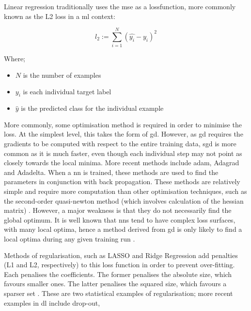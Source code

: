 Linear regression traditionally uses the  \gls{mse} as a \gls{lossfunction}, more commonly known as the L2 loss in a \gls{ml} context:

\begin{equation}
l_2 := \sum_{i = 1}^N (\hat{y_i} - y_i)^2
\end{equation}

Where;

\begin{itemize}
    \item $N$ is the number of examples  
    \item $y_i$ is each individual target label  
    \item $\hat{y}$ is the predicted class for the individual example 
\end{itemize}

More commonly, some optimisation method is required in order to minimise the \gls{loss}. At the simplest level, this takes the form of \gls{gd}. However, as \gls{gd} requires the gradients to be computed with respect to the entire training data, \gls{sgd} is more common as it is much faster, even though each individual step may not point as closely towards the local minima. More recent methods include  \gls{adam}, Adagrad and Adadelta. When a \gls{nn} is trained, these methods are used to find the parameters in conjunction with back propagation. These methods are relatively simple and require more computation than other optimisation techniques, such as the second-order quasi-newton method (which involves calculation of the hessian matrix) \cite[p.~34]{nn_tricks_trade}. However, a major weakness is that they do not necessarily find the global optimum. It is well known that \gls{nn}s tend to have complex loss surfaces, with many local optima, hence a method derived from \gls{gd} is only likely to find a local optima during any given training run \cite[pg.~83]{good_fellow_2016}.   


Methods of regularisation, such as LASSO and Ridge Regression add penalties (L1 and L2, respectively) to this loss function in order to prevent over-fitting. Each penalises the coefficients. The former penalises the absolute size, which favours smaller ones. The latter penalises the squared size, which favours a sparser set \cite{ridge_lasso}. These are two statistical examples of regularisation; more recent examples in \gls{dl} include drop-out,  %
\bigskip

